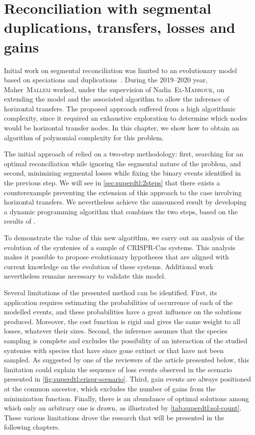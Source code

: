 \chapter{Reconciliation with segmental duplications, transfers, losses and gains}\label{chap:superdtl}

Initial work on segmental reconciliation was limited to an evolutionary model based on speciations and duplications~\parencite{Delabre2020EvolutionSegmentalDuplications}.
During the 2019--2020 year, Maher~\textsc{Mallem} worked, under the supervision of Nadia~\textsc{El-Mabrouk}, on extending the model and the associated algorithm to allow the inference of horizontal transfers.
The proposed approach suffered from a high algorithmic complexity, since it required an exhaustive exploration to determine which nodes would be horizontal transfer nodes.
In this chapter, we show how to obtain an algorithm of polynomial complexity for this problem.

The initial approach of \textcite{Delabre2020EvolutionSegmentalDuplications} relied on a two-step methodology: first, searching for an optimal reconciliation while ignoring the segmental nature of the problem, and second, minimizing segmental losses while fixing the binary events identified in the previous step.
We will see in \cref{sec:superdtl:2steps} that there exists a counterexample preventing the extension of this approach to the case involving horizontal transfers.
We nevertheless achieve the announced result by developing a dynamic programming algorithm that combines the two steps, based on the results of \textcite{Tofigh2011SimultaneousIdentificationDuplications}.

To demonstrate the value of this new algorithm, we carry out an analysis of the evolution of the syntenies of a sample of CRISPR-Cas systems.
This analysis makes it possible to propose evolutionary hypotheses that are aligned with current knowledge on the evolution of these systems.
Additional work nevertheless remains necessary to validate this model.

Several limitations of the presented method can be identified.
First, its application requires estimating the probabilities of occurrence of each of the modelled events, and these probabilities have a great influence on the solutions produced.
Moreover, the cost function is rigid and gives the same weight to all losses, whatever their sizes.
Second, the inference assumes that the species sampling is complete and excludes the possibility of an interaction of the studied syntenies with species that have since gone extinct or that have not been sampled.
As suggested by one of the reviewers of the article presented below, this limitation could explain the sequence of loss events observed in the scenario presented in \cref{fig:superdtl:crispr-scenario}.
Third, gain events are always positioned at the common ancestor, which excludes the number of gains from the minimization function.
Finally, there is an abundance of optimal solutions among which only an arbitrary one is drawn, as illustrated by \cref{tab:superdtl:sol-count}.
These various limitations drove the research that will be presented in the following chapters.

